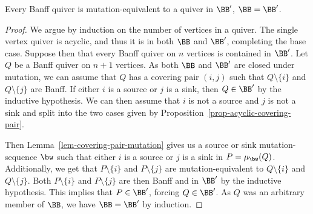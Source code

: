 \begin{thm}[OPAC-034] \label{thm-opac-034}
    Every Banff quiver is mutation-equivalent to a quiver in $\BB'$, \ie $\BB = \BB'$.
\end{thm}

\begin{proof}
    We argue by induction on the number of vertices in a quiver.
    The single vertex quiver is acyclic, and thus it is in both $\BB$ and $\BB'$, completing the base case.
    Suppose then that every Banff quiver on $n$ vertices is contained in $\BB'$.
    Let $Q$ be a Banff quiver on $n+1$ vertices.
    As both $\BB$ and $\BB'$ are closed under mutation, we can assume that $Q$ has a covering pair $(i,j)$ such that $Q \setminus \{i\}$ and $Q \setminus \{j\}$ are Banff.
    If either $i$ is a source or $j$ is a sink, then $Q \in \BB'$ by the inductive hypothesis.
    We can then assume that $i$ is not a source and $j$ is not a sink and split into the two cases given by Proposition~\ref{prop-acyclic-covering-pair}.

    Then Lemma~\ref{lem-covering-pair-mutation} gives us a source or sink mutation-sequence $\bw$ such that either $i$ is a source or $j$ is a sink in $P = \mu_\bw(Q)$.
    Additionally, we get that $P \setminus \{i\}$ and $P \setminus \{j\}$ are mutation-equivalent to $Q \setminus \{i\}$ and $Q \setminus \{j\}$.
    Both $P \setminus \{i\}$ and $P \setminus \{j\}$ are then Banff and in $\BB'$ by the inductive hypothesis.
    This implies that $P \in \BB'$, forcing $Q \in \BB'$.
    As $Q$ was an arbitrary member of $\BB$, we have $\BB = \BB'$ by induction.
\end{proof}
